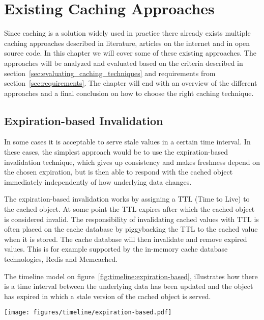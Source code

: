 \chapter{Existing Caching Approaches}
\label{chapter:caching}

Since caching is a solution widely used in practice there already exists multiple caching approaches described in literature, articles on the internet and in open source code. In this chapter we will cover some of these existing approaches. The approaches will be analyzed and evaluated based on the criteria described in section~\ref{sec:evaluating_caching_techniques} and requirements from section~\ref{sec:requirements}. The chapter will end with an overview of the different approaches and a final conclusion on how to choose the right caching technique.

\section{Expiration-based Invalidation}
\label{subsec:expiration_based_invalidation}

In some cases it is acceptable to serve stale values in a certain time interval. In these cases, the simplest approach would be to use the expiration-based invalidation technique, which gives up consistency and makes freshness depend on the chosen expiration, but is then able to respond with the cached object immediately independently of how underlying data changes.

The expiration-based invalidation works by assigning a TTL (Time to Live) to the cached object. At some point the TTL expires after which the cached object is considered invalid. The responsibility of invalidating cached values with TTL is often placed on the cache database by piggybacking the TTL to the cached value when it is stored. The cache database will then invalidate and remove expired values. This is for example supported by the in-memory cache database technologies, Redis and Memcached.

The timeline model on figure~\ref{fig:timeline:expiration-based}, illustrates how there is a time interval between the underlying data has been updated and the object has expired in which a stale version of the cached object is served.

\begin{figure*}[ht!]
  \centering
  \texttt{[image: figures/timeline/expiration-based.pdf]}
  \caption{The lifecycle of the expiration-based invalidation technique}
  \label{fig:timeline:expiration-based}
\end{figure*}

